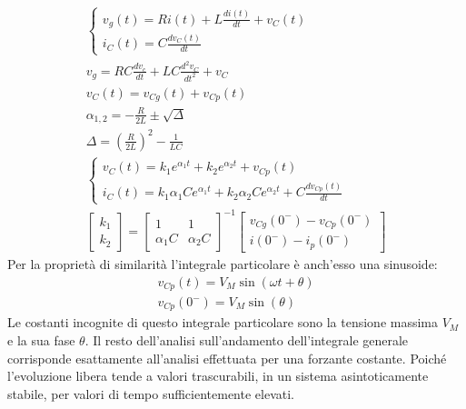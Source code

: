 \documentclass{article}
\numberwithin{equation}{subsection}
\begin{document}
\begin{gather*}
    \begin{cases}
        v_g(t)=Ri(t)+\displaystyle L\frac{di(t)}{dt}+v_C(t)\\
        i_C(t)=\displaystyle C\frac{dv_C(t)}{dt}
    \end{cases}\\
    v_g=RC\displaystyle\frac{dv_c}{dt}+LC\frac{d^2v_C}{dt^2}+v_C\\
    v_C(t)=v_{Cg}(t)+v_{Cp}(t)\\
    \alpha_{1,2}=\displaystyle-\frac{R}{2L}\pm\sqrt{\Delta}\\
    \Delta=\left(\displaystyle\frac{R}{2L}\right)^2-\frac{1}{LC}\\
    \begin{cases}
        v_C(t)=k_1e^{\alpha_1t}+k_2e^{\alpha_2t}+v_{Cp}(t)\\
        i_C(t)=k_1\alpha_1Ce^{\alpha_1t}+k_2\alpha_2Ce^{\alpha_2t}+C\displaystyle\frac{dv_{Cp}(t)}{dt}
    \end{cases}\\
    \begin{bmatrix}
        k_1\\k_2
    \end{bmatrix}=\begin{bmatrix}
        1&1\\\alpha_1C&\alpha_2C
    \end{bmatrix}^{-1}\begin{bmatrix}
        v_{Cg}(0^-)-v_{Cp}(0^-)\\i(0^-)-i_p(0^-)
    \end{bmatrix}
\end{gather*}
Per la proprietà di similarità l'integrale particolare è anch'esso una sinusoide:
\begin{gather*}
    v_{Cp}(t)=V_M\sin(\omega t+\theta)\\
    v_{Cp}(0^-)=V_M\sin(\theta)
\end{gather*}
Le costanti incognite di questo integrale particolare sono la tensione massima $V_M$ e la sua fase $\theta$. Il resto dell'analisi sull'andamento dell'integrale generale 
corrisponde esattamente all'analisi effettuata per una forzante costante. Poiché l'evoluzione libera tende a valori trascurabili, in un sistema asintoticamente stabile, per 
valori di tempo sufficientemente elevati. 
\end{document}
